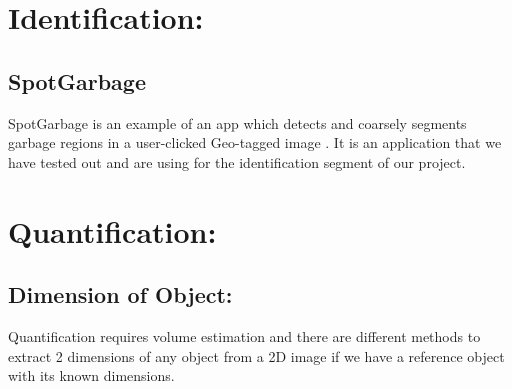 \section{Identification:}
\subsection{SpotGarbage} 
SpotGarbage is an example of an app which detects and coarsely segments garbage regions in a user-clicked Geo-tagged image \cite{mittal}. It is an application that we have tested out and are using for the identification segment of our project.
\section{Quantification:}
\subsection{Dimension of Object:}
Quantification requires volume estimation and there are different methods to extract 2 dimensions of any object from a 2D image if we have a reference object with its known dimensions.\\
